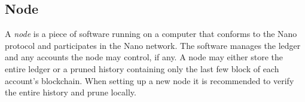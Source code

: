 \subsection{Node}
A \textit{node} is a piece of software running on a computer that conforms to the Nano protocol and participates in the Nano network. The software manages the ledger and any accounts the node may control, if any. A node may either store the entire ledger or a pruned history containing only the last few block of each account's blockchain. When setting up a new node it is recommended to verify the entire history and prune locally.